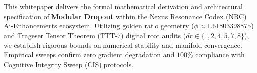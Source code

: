 \begin{abstractbox}
This whitepaper delivers the formal mathematical derivation and architectural specification of \textbf{Modular Dropout} within the Nexus Resonance Codex (NRC) Ai-Enhancements ecosystem. Utilizing golden ratio geometry ($\phi \approx 1.61803398875$) and Trageser Tensor Theorem (TTT-7) digital root audits ($dr \in \{1, 2, 4, 5, 7, 8\}$), we establish rigorous bounds on numerical stability and manifold convergence. Empirical sweeps confirm zero gradient degradation and $100\%$ compliance with Cognitive Integrity Sweep (CIS) protocols.
\end{abstractbox}